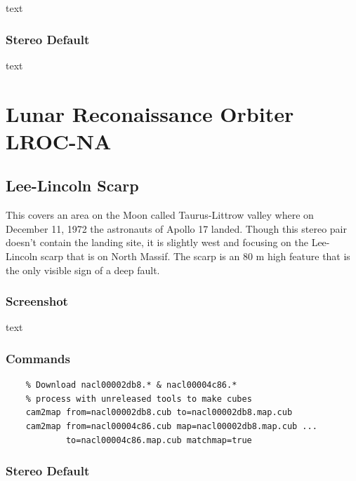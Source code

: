 text

\subsubsection*{Stereo Default}

text

\section{Lunar Reconaissance Orbiter LROC-NA}

\subsection{Lee-Lincoln Scarp}

This covers an area on the Moon called Taurus-Littrow valley where on
December 11, 1972 the astronauts of Apollo 17 landed. Though this
stereo pair doesn't contain the landing site, it is slightly west and
focusing on the Lee-Lincoln scarp that is on North Massif. The scarp
is an 80 m high feature that is the only visible sign of a deep fault.

\subsubsection*{Screenshot}

text

\subsubsection*{Commands}

\begin{verbatim}
    % Download nacl00002db8.* & nacl00004c86.*
    % process with unreleased tools to make cubes
    cam2map from=nacl00002db8.cub to=nacl00002db8.map.cub
    cam2map from=nacl00004c86.cub map=nacl00002db8.map.cub ...
            to=nacl00004c86.map.cub matchmap=true
\end{verbatim}

\subsubsection*{Stereo Default}

